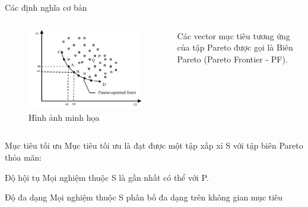\documentclass{beamer}
\begin{document}
    \begin{frame}{Các định nghĩa cơ bản}
        \begin{columns}
        \begin{figure}
            \centering
            \includegraphics[scale = 0.5]{paretofront.jpg}
            \caption{Hình ảnh minh họa}
            \label{fig:my_label}
        \end{figure}
        Các vector mục tiêu tương ứng của tập Pareto được gọi là Biên Pareto (Pareto Frontier - PF).
        \end{columns}
    \end{frame}
    \begin{frame}{Mục tiêu tối ưu}
        Mục tiêu tối ưu là đạt được một tập xấp xỉ S với tập biên Pareto thỏa mãn:
        \pause
        \begin{block}{Độ hội tụ}
            Mọi nghiệm thuộc S là gần nhất có thể với P.
            \end{block}
        \pause
        \begin{block}{Độ đa dạng}
        Mọi nghiệm thuộc S phân bố đa dạng trên không gian mục tiêu
        \end{block}
    \end{frame}
\end{document}
